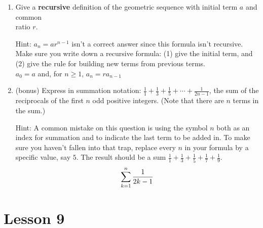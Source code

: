 \documentclass[11pt]{amsart}
\begin{document}
\begin{enumerate}
\begin{enumerate}
\end{enumerate}

\item  Give a {\bf recursive} definition of the geometric sequence
with initial term $a$ and common\\
 ratio $r$. 

Hint: $a_{n} = a r^{n-1}$ isn't a correct answer since this formula isn't recursive.
Make sure you write down a recursive formula: (1) give the initial term, and 
(2) give the rule for building new terms from previous terms.\\[3pt]

{\color{blue} $a_0 = a$ and, for $n\geq 1$, $a_n = ra_{n-1}$\\[5pt] }

\item (bonus) Express in summation notation: $\displaystyle  \frac{1}{1}+\frac{1}{3}+\frac{1}{5}+
\cdots+\frac{1}{2n-1}$, the sum of the reciprocals of the first $n$ odd
positive integers. (Note that there are $n$ terms in the sum.)

Hint: A common mistake on this question is using the symbol $n$ both as an index for summation
and to indicate the last term to be added in. To make sure you haven't fallen into that trap, replace every
$n$ in your formula by a specific value, say $5$. The result should be a sum
  $\displaystyle  \frac{1}{1}+\frac{1}{3}+\frac{1}{5}+\frac{1}{7}+\frac{1}{9}$.\\[3pt]
  {\color{blue}
  \[ 
  \sum_{k = 1}^n \frac{1}{2k-1}\\[5pt]
  \]
  }

 \end{enumerate}
 
 \section{Lesson 9}
 
\end{document}
